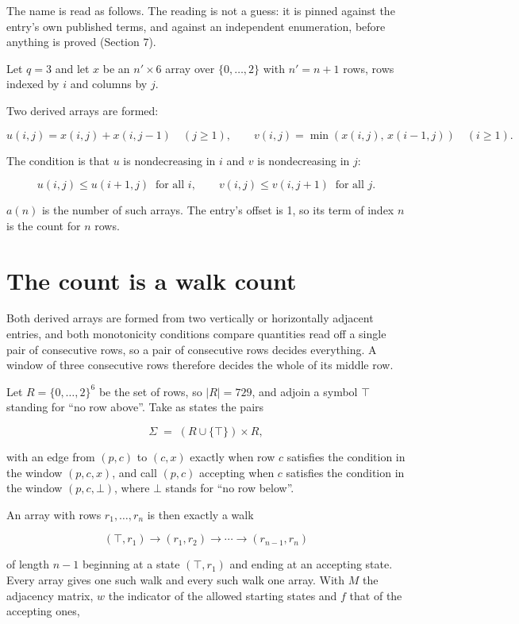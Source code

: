 \documentclass[11pt]{article}
\theoremstyle{definition}
\begin{document}
The name is read as follows. The reading is not a guess: it is pinned against the entry's own published terms, and against an independent enumeration, before anything is proved (Section 7).

Let $q = 3$ and let $x$ be an $n' \times 6$ array over $\{0,\dots,2\}$ with $n' = n + 1$ rows, rows indexed by $i$ and columns by $j$.

Two derived arrays are formed:

\[u(i,j) = x(i,j) + x(i,j{-}1)\quad (j \ge 1), \qquad v(i,j) = \min(x(i,j),\,x(i{-}1,j))\quad (i \ge 1).\]

The condition is that $u$ is nondecreasing in $i$ and $v$ is nondecreasing in $j$:

\[u(i,j) \le u(i{+}1,j) \ \text{ for all } i, \qquad v(i,j) \le v(i,j{+}1) \ \text{ for all } j.\]

$a(n)$ is the number of such arrays. The entry's offset is 1, so its term of index $n$ is the count for $n$ rows.

\section{The count is a walk count}

Both derived arrays are formed from two vertically or horizontally adjacent entries, and both monotonicity conditions compare quantities read off a single pair of consecutive rows, so a pair of consecutive rows decides everything. A window of three consecutive rows therefore decides the whole of its middle row.

Let $R = \{0,\dots,2\}^{6}$ be the set of rows, so $|R| = 729$, and adjoin a symbol $\top$ standing for ``no row above''. Take as states the pairs

\[\Sigma \;=\; (R \cup \{\top\}) \times R,\]

with an edge from $(p,c)$ to $(c,x)$ exactly when row $c$ satisfies the condition in the window $(p,c,x)$, and call $(p,c)$ accepting when $c$ satisfies the condition in the window $(p,c,\bot)$, where $\bot$ stands for ``no row below''.

An array with rows $r_1,\dots,r_n$ is then exactly a walk

\[(\top,r_1) \to (r_1,r_2) \to \cdots \to (r_{n-1},r_n)\]

of length $n-1$ beginning at a state $(\top,r_1)$ and ending at an accepting state. Every array gives one such walk and every such walk one array. With $M$ the adjacency matrix, $w$ the indicator of the allowed starting states and $f$ that of the accepting ones,
\end{document}

